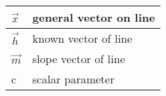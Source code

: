 \begin{table}[H]
    \centering
    \begin{tabular}{|l|l|}
    \hline
      $\vec{x}$   & general vector on line \\
      \hline
      $\vec{h}$   & known vector of line\\
      \hline
      $\vec{m}$ & slope vector of line\\
      \hline
      c &  scalar parameter\\
      \hline
    \end{tabular}
    \caption{}
    \label{tab:tables/table.tex}
\end{table}